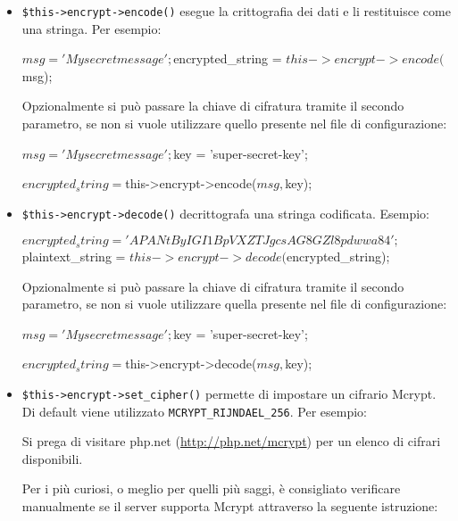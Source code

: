 \begin{itemize}
\item \verb|$this->encrypt->encode()| esegue la crittografia dei dati e li restituisce come una stringa. Per esempio:

\begin{code}
$msg = 'My secret message';

$encrypted_string = $this->encrypt->encode($msg);
\end{code}

Opzionalmente si può passare la chiave di cifratura tramite il secondo parametro, se non si vuole utilizzare quello presente nel file di configurazione:

\begin{code}
$msg = 'My secret message';
$key = 'super-secret-key';

$encrypted_string = $this->encrypt->encode($msg, $key);
\end{code}

\item \verb|$this->encrypt->decode()| decrittografa una stringa codificata. Esempio:

\begin{code}
$encrypted_string = 'APANtByIGI1BpVXZTJgcsAG8GZl8pdwwa84';

$plaintext_string = $this->encrypt->decode($encrypted_string);
\end{code}

Opzionalmente si può passare la chiave di cifratura tramite il secondo parametro, se non si vuole utilizzare quella presente nel file di configurazione:

\begin{code}
$msg = 'My secret message';
$key = 'super-secret-key';

$encrypted_string = $this->encrypt->decode($msg, $key);
\end{code}

\item \verb|$this->encrypt->set_cipher()| permette di impostare un cifrario Mcrypt. Di default viene utilizzato \verb|MCRYPT_RIJNDAEL_256|. Per esempio:


Si prega di visitare php.net (\url{http://php.net/mcrypt}) per un elenco di cifrari disponibili.

Per i più curiosi, o meglio per quelli più saggi, è consigliato verificare manualmente se il server supporta Mcrypt attraverso la seguente istruzione:


\end{itemize}
